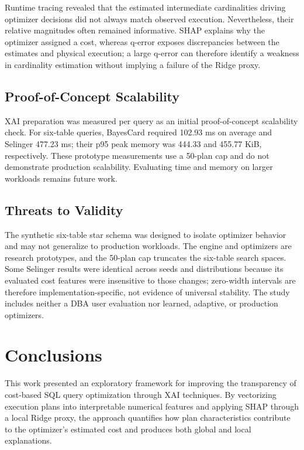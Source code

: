 \documentclass[conference]{IEEEtran}
\begin{document}
Runtime tracing revealed that the estimated intermediate cardinalities driving optimizer decisions did not always match observed execution. Nevertheless, their relative magnitudes often remained informative. SHAP explains why the optimizer assigned a cost, whereas q-error exposes discrepancies between the estimates and physical execution; a large q-error can therefore identify a weakness in cardinality estimation without implying a failure of the Ridge proxy.


\subsection{Proof-of-Concept Scalability}

XAI preparation was measured per query as an initial proof-of-concept scalability check. For six-table queries, BayesCard required 102.93 ms on average and Selinger 477.23 ms; their p95 peak memory was 444.33 and 455.77 KiB, respectively. These prototype measurements use a 50-plan cap and do not demonstrate production scalability. Evaluating time and memory on larger workloads remains future work.


\subsection{Threats to Validity}

The synthetic six-table star schema was designed to isolate optimizer behavior and may not generalize to production workloads. The engine and optimizers are research prototypes, and the 50-plan cap truncates the six-table search spaces. Some Selinger results were identical across seeds and distributions because its evaluated cost features were insensitive to those changes; zero-width intervals are therefore implementation-specific, not evidence of universal stability. The study includes neither a DBA user evaluation nor learned, adaptive, or production optimizers.


\FloatBarrier
\section{Conclusions}

This work presented an exploratory framework for improving the transparency of cost-based SQL query optimization through XAI techniques. By vectorizing execution plans into interpretable numerical features and applying SHAP through a local Ridge proxy, the approach quantifies how plan characteristics contribute to the optimizer's estimated cost and produces both global and local explanations.
\end{document}
